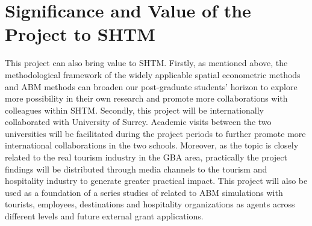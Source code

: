 \documentclass[11pt,a4paper]{amsart}
\theoremstyle{plain}
\theoremstyle{definition}
\begin{document}
\section{Significance and Value of the Project to SHTM}
\noindent This project can also bring value to SHTM. Firstly, as mentioned above, the methodological framework of the widely applicable spatial econometric methods and ABM methods can broaden our post-graduate students’ horizon to explore more possibility in their own research and promote more collaborations with colleagues within SHTM. Secondly, this project will be internationally collaborated with University of Surrey. Academic visits between the two universities will be facilitated during the project periods to further promote more international collaborations in the two schools. Moreover, as the topic is closely related to the real tourism industry in the GBA area, practically the project findings will be distributed through media channels to the tourism and hospitality industry to generate greater practical impact. This project will also be used as a foundation of a series studies of related to ABM simulations with tourists, employees, destinations and hospitality organizations as agents across different levels and future external grant applications. 

\printbibliography %
		
\end{document}
